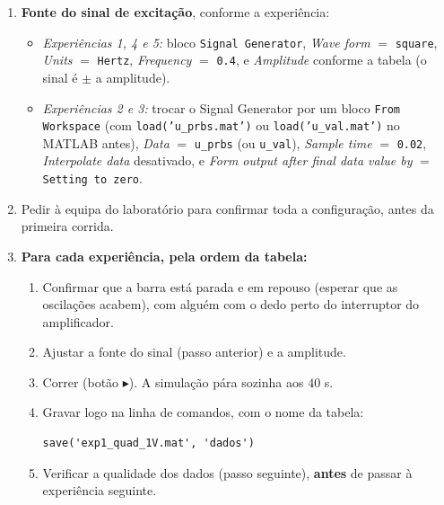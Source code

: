 \documentclass[a4paper,11pt]{article}
\begin{document}
\begin{enumerate}[label=$\square$, leftmargin=1.5em]
  \item \textbf{Fonte do sinal de excitação}, conforme a experiência:
  \begin{itemize}
    \item \emph{Experiências 1, 4 e 5:} bloco \texttt{Signal Generator}, \emph{Wave form} $=$ \texttt{square}, \emph{Units} $=$ \texttt{Hertz}, \emph{Frequency} $=$ \texttt{0.4}, e \emph{Amplitude} conforme a tabela (o sinal é $\pm$ a amplitude).
    \item \emph{Experiências 2 e 3:} trocar o Signal Generator por um bloco \texttt{From Workspace} (com \texttt{load('u\_prbs.mat')} ou \texttt{load('u\_val.mat')} no MATLAB antes), \emph{Data} $=$ \texttt{u\_prbs} (ou \texttt{u\_val}), \emph{Sample time} $=$ \texttt{0.02}, \emph{Interpolate data} desativado, e \emph{Form output after final data value by} $=$ \texttt{Setting to zero}.
  \end{itemize}

  \item Pedir à equipa do laboratório para confirmar toda a configuração, antes da primeira corrida.

  \item \textbf{Para cada experiência, pela ordem da tabela:}
  \begin{enumerate}[label=(\alph*)]
    \item Confirmar que a barra está parada e em repouso (esperar que as oscilações acabem), com alguém com o dedo perto do interruptor do amplificador.
    \item Ajustar a fonte do sinal (passo anterior) e a amplitude.
    \item Correr (botão $\blacktriangleright$). A simulação pára sozinha aos $40$ s.
    \item Gravar logo na linha de comandos, com o nome da tabela:
    \begin{verbatim}
save('exp1_quad_1V.mat', 'dados')
    \end{verbatim}
    \item Verificar a qualidade dos dados (passo seguinte), \textbf{antes} de passar à experiência seguinte.
  \end{enumerate}


\end{enumerate}
\end{document}
